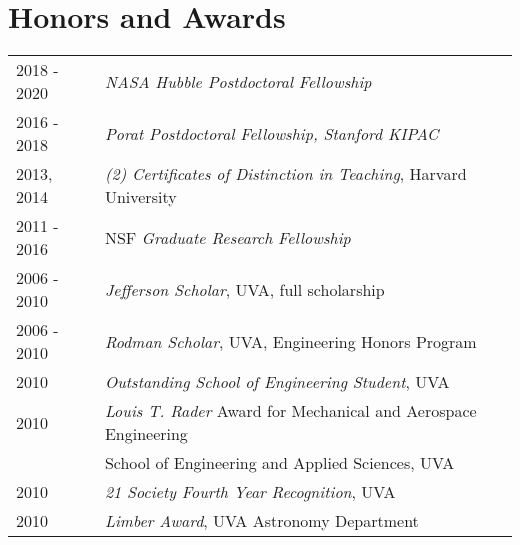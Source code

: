 \section*{Honors and Awards}
\begin{tabular*}{\textwidth}{@{\hspace{10pt}}p{1in}l}
2018 - 2020 & \emph{NASA Hubble Postdoctoral Fellowship}\\
2016 - 2018 & \emph{Porat Postdoctoral Fellowship, Stanford KIPAC}\\
2013, 2014 & \emph{(2) Certificates of Distinction in Teaching}, Harvard University \\
2011 - 2016 & NSF \emph{Graduate Research Fellowship}\\
2006 - 2010 & \emph{Jefferson Scholar}, UVA, full scholarship\\
2006 - 2010 & \emph{Rodman Scholar}, UVA, Engineering Honors Program\\
2010 & \emph{Outstanding School of Engineering Student}, UVA\\
2010 & \emph{Louis T. Rader} Award for Mechanical and Aerospace Engineering\\
& School of Engineering and Applied Sciences, UVA\\
2010 & \emph{21 Society Fourth Year Recognition}, UVA\\
2010 & \emph{Limber Award}, UVA Astronomy Department\\
\end{tabular*}
